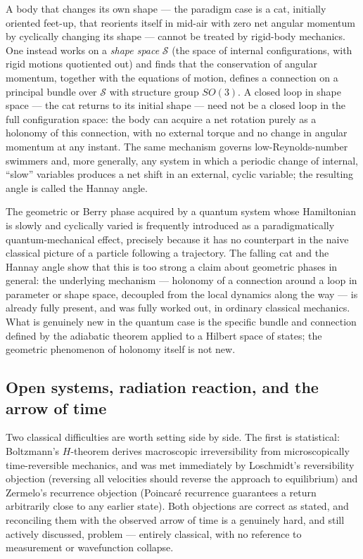 A body that changes its own shape --- the paradigm case is a cat, initially
oriented feet-up, that reorients itself in mid-air with zero net angular
momentum by cyclically changing its shape --- cannot be treated by rigid-body
mechanics. One instead works on a \emph{shape space} $\mathcal S$ (the space of
internal configurations, with rigid motions quotiented out) and finds that the
conservation of angular momentum, together with the equations of motion,
defines a connection on a principal bundle over $\mathcal S$ with structure
group $SO(3)$. A closed loop in shape space --- the cat returns to its initial
shape --- need not be a closed loop in the full configuration space: the body
can acquire a net rotation purely as a holonomy of this connection, with no
external torque and no change in angular momentum at any instant. The same
mechanism governs low-Reynolds-number swimmers and, more generally, any system
in which a periodic change of internal, ``slow'' variables produces a net shift
in an external, cyclic variable; the resulting angle is called the Hannay angle.

The geometric or Berry phase acquired by a quantum system whose Hamiltonian is
slowly and cyclically varied is frequently introduced as a paradigmatically
quantum-mechanical effect, precisely because it has no counterpart in the naive
classical picture of a particle following a trajectory. The falling cat and the
Hannay angle show that this is too strong a claim about geometric phases in
general: the underlying mechanism --- holonomy of a connection around a loop in
parameter or shape space, decoupled from the local dynamics along the way --- is
already fully present, and was fully worked out, in ordinary classical
mechanics. What is genuinely new in the quantum case is the specific bundle and
connection defined by the adiabatic theorem applied to a Hilbert space of
states; the geometric phenomenon of holonomy itself is not new.

\subsection{Open systems, radiation reaction, and the arrow of time}

Two classical difficulties are worth setting side by side. The first is
statistical: Boltzmann's $H$-theorem derives macroscopic irreversibility from
microscopically time-reversible mechanics, and was met immediately by
Loschmidt's reversibility objection (reversing all velocities should reverse
the approach to equilibrium) and Zermelo's recurrence objection (Poincar\'e
recurrence guarantees a return arbitrarily close to any earlier state). Both
objections are correct as stated, and reconciling them with the observed arrow
of time is a genuinely hard, and still actively discussed, problem --- entirely
classical, with no reference to measurement or wavefunction collapse.

